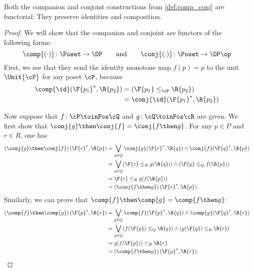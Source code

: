 \begin{proposition}\label{prop:comp_conj}
Both the companion and conjoint constructions from \cref{def:comp_conj} are functorial: They preserve identities and composition.
\end{proposition}
\begin{proof}
We will show that the companion and conjoint are functors of the following forms:
\begin{equation}
\comp{(\cdot)}\colon\Poset\to\DP
\qquad\text{and}\qquad
\conj{(\cdot)}\colon\Poset\to\DP\op
\end{equation}
First, we see that they send the identity monotone map $f(p)=p$ to the unit $\Unit{\cP }$ for any poset $\cP $, because 
\begin{equation}
    \begin{aligned}
        \comp{\id}(\F{p_1}^*,\R{p_2})&= (\F{p_1} \leq_{\cP} \R{p_2})\\
        &=\conj{\id}(\F{p_1}^*,\R{p_2})
    \end{aligned}
\end{equation}

Now suppose that $f\colon  \cP \toinPos \cQ $ and $g\colon \cQ \toinPos \cR$ are given. We first show that $\conj{g}\then\conj{f}=\conj{f\then g}$.
For any $p\in P$ and $r\in R$, one has
\begin{equation}
\begin{aligned}
	\left(\conj{g}\then \conj{f}\right)(\F{r}^*,\R{p})
	&=\bigvee_{q\in Q} \conj{g}(\F{r}^*,\R{q})\wedge\conj{f}(\F{q}^*,\R{p})\\
	&=\bigvee_{q\in Q} (\F{r}\leq_R g(\R{q})) \wedge (\F{q}\leq_Q f(\R{p})) \\
	&= \F{r}\leq_R g(f(\R{p}))\\
    &=\left(\conj{f\then g}\right)(\F{r}^*,\R{p}).
\end{aligned}
\end{equation}
Similarly, we can prove that $\comp{f}\then \comp{g}=\comp{f\then g}$:
\begin{equation}
    \begin{aligned}
    \left(\comp{f}\then \comp{g}\right)(\F{p}^*,\R{r})&=\bigvee_{q\in Q} \comp{f}(\F{p}^*,\R{q})\wedge\comp{g}(\F{q}^*,\R{r})\\
    &=\bigvee_{q\in Q} (f(\F{p})\leq_Q \R{q})\wedge (g(\F{q})\leq_R \R{r})\\
    &=g(f(\F{p}))\leq_R \R{r}\\
    &=\left(\comp{f\then g}\right)(\F{p}^*,\R{r}).
    \end{aligned}
\end{equation}
\end{proof}


